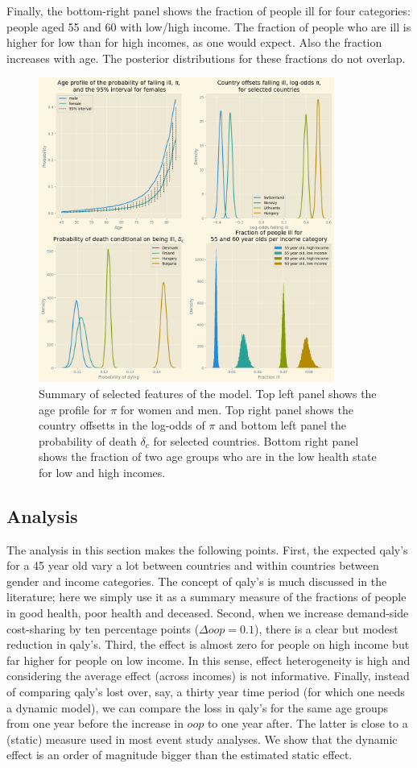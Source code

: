 \documentclass[a4paper,12pt]{article}
\begin{document}
Finally, the bottom-right panel shows the fraction of people ill for four categories: people aged 55 and 60 with low/high income. The fraction of people who are ill is higher for low than for high incomes, as one would expect. Also the fraction increases with age. The posterior distributions for these fractions do not overlap.

\begin{figure}[htbp]
\centering
\includegraphics[height=10cm]{./figures/summary_figure.png}
\caption{\label{fig:summary}Summary of selected features of the model. Top left panel shows the age profile for \(\pi\) for women and men. Top right panel shows the country offsetts in the log-odds of \(\pi\) and bottom left panel the probability of death \(\delta_c\) for selected countries. Bottom right panel shows the fraction of two age groups who are in the low health state for low and high incomes.}
\end{figure}
\subsection{Analysis}
\label{sec:orga8493d1}

The analysis in this section makes the following points. First, the expected qaly's for a 45 year old vary a lot between countries and within countries between gender and income categories. The concept of qaly's is much discussed in the literature; here we simply use it as a summary measure of the fractions of people in good health, poor health and deceased. Second, when we increase demand-side cost-sharing by ten percentage points (\(\Delta oop = 0.1\)), there is a clear but modest reduction in qaly's. Third, the effect is almost zero for people on high income but far higher for people on low income. In this sense, effect heterogeneity is high and considering the average effect (across incomes) is not informative. Finally, instead of comparing qaly's lost over, say, a thirty year time period (for which one needs a dynamic model), we can compare the loss in qaly's for the same age groups from one year before the increase in \(oop\) to one year after. The latter is close to a (static) measure used in most event study analyses. We show that the dynamic effect is an order of magnitude bigger than the estimated static effect.
\end{document}
